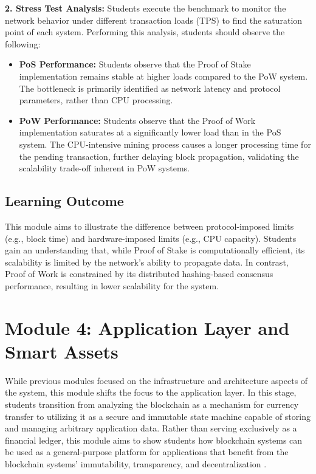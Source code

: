 \textbf{2. Stress Test Analysis:}
Students execute the benchmark to monitor the network behavior under different transaction loads (TPS) to find the saturation point of each system. Performing this analysis, students should observe the following:

\begin{itemize}
    \item \textbf{PoS Performance:}  
    Students observe that the Proof of Stake implementation remains stable at higher loads compared to the PoW system. The bottleneck is primarily identified as network latency and protocol parameters, rather than CPU processing.

    \item \textbf{PoW Performance:}  
    Students observe that the Proof of Work implementation saturates at a significantly lower load than in the PoS system. The CPU-intensive mining process causes a longer processing time for the pending transaction, further delaying block propagation, validating the scalability trade-off inherent in PoW systems.
\end{itemize}

\subsection{Learning Outcome}

This module aims to illustrate the difference between protocol-imposed limits (e.g., block time) and hardware-imposed limits (e.g., CPU capacity). Students gain an understanding that, while Proof of Stake is computationally efficient, its scalability is limited by the network’s ability to propagate data. In contrast, Proof of Work is constrained by its distributed hashing-based consensus performance, resulting in lower scalability for the system.

\newpage
\section{Module 4: Application Layer and Smart Assets} \label{ch5_module4}

While previous modules focused on the infrastructure and architecture aspects of the system, this module shifts the focus to the application layer. In this stage, students transition from analyzing the blockchain as a mechanism for currency transfer to utilizing it as a secure and immutable state machine capable of storing and managing arbitrary application data. Rather than serving exclusively as a financial ledger, this module aims to show students  how blockchain systems can be used as a general-purpose platform for applications that benefit from the blockchain systems' immutability, transparency, and decentralization .

